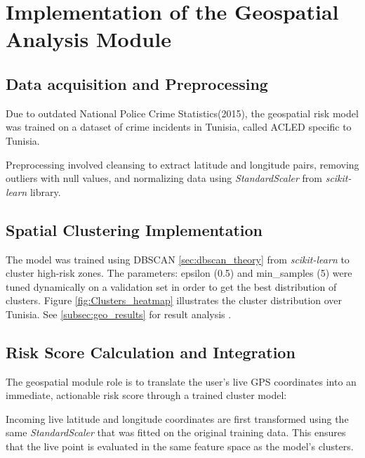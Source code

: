 \documentclass[12pt,a4paper,oneside,english]{book}
\begin{document}
\section{Implementation of the Geospatial Analysis Module}
\label{geospatial_implementation}
\subsection{Data acquisition and Preprocessing}
Due to outdated National Police Crime Statistics(2015), the geospatial risk model was trained on a dataset of crime incidents in Tunisia, called ACLED \cite{raleigh2010acled} specific to Tunisia.

Preprocessing involved cleansing to extract latitude and longitude pairs, removing outliers with null values, and normalizing data using \textit{StandardScaler} from \textit{scikit-learn} library.
\subsection{Spatial Clustering Implementation}
The model was trained using DBSCAN \ref{sec:dbscan_theory} from \textit{scikit-learn} to cluster high-risk zones. 
The parameters: epsilon (0.5) and min\_samples (5) were tuned dynamically on a validation set in order to get the best distribution of clusters.
Figure \ref{fig:Clusters_heatmap} illustrates the cluster distribution over Tunisia. See \ref{subsec:geo_results} for result analysis .


\subsection{Risk Score Calculation and Integration}
The geospatial module role is to translate the user's live GPS coordinates into an immediate, actionable risk score  through a trained cluster model:

Incoming live latitude and longitude coordinates are first transformed using the same \textit{StandardScaler} that was fitted on the original training data. This ensures that the live point is evaluated in the same feature space as the model's clusters.
\end{document}
